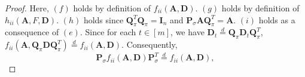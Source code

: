 \documentclass[journal,draftcls,onecolumn]{IEEEtran}
\theoremstyle{mystyle}
\newcommand{\bfD}{\mathbf{D}}
\newcommand{\bfQ}{\mathbf{Q}}
\newcommand{\bfA}{\mathbf{A}}
\newcommand{\bfP}{\mathbf{P}}
\newcommand{\sifat}[1]{\marginpar{+}{\bf Sifat's remark}: {\em #1}}
\begin{document}
\begin{proof}


Here, $(f)$ holds by definition of $f_{ii}(\bfA, \bfD)$. $(g)$ holds by definition of $h_{ii}(\bfA, F, \bfD)$. $(h)$ holds since $\mathbf{Q}_{\pi}^T \mathbf{Q}_{\pi} = \mathbf{I}_n$ and $\bfP_{\sigma} \bfA \bfQ_{\pi}^T = \bfA$. $(i)$ holds as a consequence of $(e)$. Since for each $t \in [m]$, we have $\mathbf{D}_t \overset{d}{=} \mathbf{Q}_{\pi}\mathbf{D}_t \mathbf{Q}_{\pi}^T$, 
$ f_{ii}(\mathbf{A}, \mathbf{Q}_{\pi}\mathbf{D} \mathbf{Q}_{\pi}^T) \overset{d}{=}  f_{ii}(\mathbf{A}, \mathbf{D}) 
.$
Consequently, 
\[ \mathbf{P}_{\sigma} f_{ii}( \mathbf{A}, \mathbf{D}) \mathbf{P}_{\sigma}^T \overset{d}{=} f_{ii}( \mathbf{A}, \mathbf{D}),\]


\end{proof}
\end{document}
